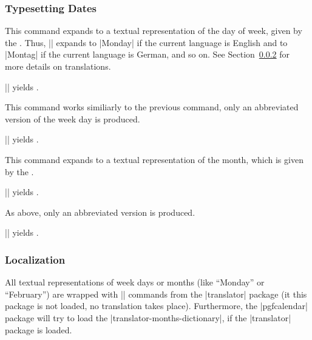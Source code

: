 \subsubsection{Typesetting Dates}




\begin{command}{\pgfcalendarweekdayname{}}
  This command expands to a textual representation of the day of week,
  given by the . Thus,
  || expands to |Monday| if the current
  language is English and to |Montag| if the current language is
  German, and so on. See Section~\ref{section-calendar-locale} for
  more details on translations.

  \example || yields
  \texttt{}. 
\end{command}


\begin{command}{\pgfcalendarweekdayshortname{}}
  This command works similiarly to the previous command, only an
  abbreviated version of the week day is produced.

  \example || yields
  \texttt{}. 
\end{command}


\begin{command}{\pgfcalendarmonthname{}}
  This command expands to a textual representation of the month, which
  is given by the .

  \example || yields
  \texttt{}. 
\end{command}


\begin{command}{\pgfcalendarmonthshortname{}}
  As above, only an abbreviated version is produced.

  \example || yields
  \texttt{}.   
\end{command}



\subsubsection{Localization}

\label{section-calendar-locale}
All textual representations of week days or months (like ``Monday'' or
``February'') are wrapped with |\translate| commands from the
|translator| package (it this package is not loaded, no translation
takes place). Furthermore, the |pgfcalendar| package will try to load
the |translator-months-dictionary|, if the |translator| package is
loaded.

